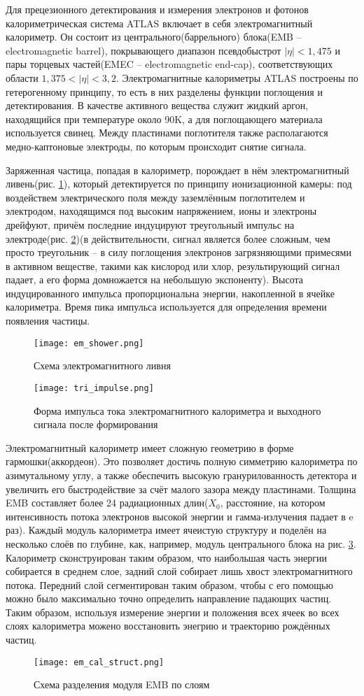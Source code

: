 Для прецезионного детектирования и измерения электронов и фотонов калориметрическая система ATLAS включает в себя электромагнитный калориметр. Он состоит из центрального(баррельного) блока(EMB -- electromagnetic barrel), покрывающего диапазон псевдобыстрот $|\eta| < 1,475$ и пары торцевых частей(EMEC -- electromagnetic end-cap), соответствующих области $1,375 < |\eta| < 3,2$. Электромагнитные калориметры ATLAS построены по гетерогенному принципу, то есть в них разделены функции поглощения и детектирования. В качестве активного вещества служит жидкий аргон, находящийся при температуре около 90K, а для поглощающего материала используется свинец. Между пластинами поглотителя также располагаются медно-каптоновые электроды, по которым происходит снятие сигнала.\par
Заряженная частица, попадая в калориметр, порождает в нём электромагнитный ливень(рис. \ref{fig:em_shower})\parencite{em_shower_wiki}, который детектируется по принципу ионизационной камеры: под воздействем электрического поля между заземлённым поглотителем и электродом, находящимся под высоким напряжением, ионы и электроны дрейфуют, причём последние индуцируют треугольный импульс на электроде(рис. \ref{fig:tri_impulse})(в действительности, сигнал является более сложным, чем просто треугольник -- в силу поглощения электронов загрязняющими примесями в активном веществе, такими как кислород или хлор, результирующий сигнал падает, а его форма домножается на небольшую экспоненту). Высота индуцированного импульса пропорциональна энергии, накопленной в ячейке калориметра. Время пика импульса используется для определения времени появления частицы.\par
\begin{figure}[ht]
    \centering
    \texttt{[image: em\_shower.png]}
    \caption{Схема электромагнитного ливня}
    \label{fig:em_shower}
\end{figure}
\begin{figure}[ht]
    \centering
    \texttt{[image: tri\_impulse.png]}
    \caption{Форма импульса тока электромагнитного калориметра и выходного сигнала после формирования}
    \label{fig:tri_impulse}
\end{figure}
Электромагнитный калориметр имеет сложную геометрию в форме гармошки(аккордеон). Это позволяет достичь полную симметрию калориметра по азимутальному углу, а также обеспечить высокую гранурилованность детектора и увеличить его быстродействие за счёт малого зазора между пластинами. Толщина EMB составляет более 24 радиационных длин($X_0$, расстояние, на котором интенсивность потока электронов высокой энергии и гамма-излучения падает в e раз). Каждый модуль калориметра имеет ячеистую структуру и поделён на несколько слоёв по глубине, как, например, модуль центрального блока на рис. \ref{fig:em_cal_struct}. Калориметр сконструирован таким образом, что наибольшая часть энергии собирается в среднем слое, задний слой собирает лишь хвост электромагнитного потока. Передний слой сегментирован таким образом, чтобы с его помощью можно было максимально точно определить направление падающих частиц. Таким образом, используя измерение энергии и положения всех ячеек во всех слоях калориметра можено восстановить энегрию и траекторию рождённых частиц.
\begin{figure}[ht]
    \centering
    \texttt{[image: em\_cal\_struct.png]}
    \caption{Схема разделения модуля EMB по слоям}
    \label{fig:em_cal_struct}
\end{figure}
